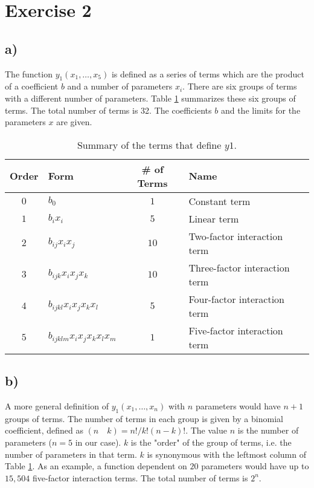 \section*{Exercise 2}

\subsection*{a)}

The function $y_1(x_1, \dots , x_5)$ is defined as a series of terms which are the product of a coefficient $b$ and a number of parameters $x_i$. There are six groups of terms with a different number of parameters. Table \ref{tab:funko_terms} summarizes these six groups of terms. The total number of terms is 32. The coefficients $b$ and the limits for the parameters $x$ are given. \cite{homework-w4}

\begin{table}[h!]
\centering
\begin{tabular}{c|lcl}
	Order & Form & \# of Terms & Name \\
	\hline
	$0$ & $b_0$ & $1$ & Constant term \\
	$1$ & $b_i x_i$ & $5$ & Linear term \\
	$2$ & $b_{ij} x_i x_j$ & $10$ & Two-factor interaction term \\
	$3$ & $b_{ijk} x_i x_j x_k$ & $10$ & Three-factor interaction term \\
	$4$ & $b_{ijkl} x_i x_j x_k x_l$ & $5$ & Four-factor interaction term \\
	$5$ & $b_{ijklm} x_i x_j x_k x_l x_m$ & $1$ & Five-factor interaction term \\
\end{tabular}
\caption{Summary of the terms that define $y1$.}
\label{tab:funko_terms}
\end{table}

\subsection*{b)}

A more general definition of $y_1(x_1, \dots, x_n)$ with $n$ parameters would have $n + 1$ groups of terms. The number of terms in each group is given by a binomial coefficient, defined as $(n \quad k) = n!/k!(n-k)!$. The value $n$ is the number of parameters ($n = 5$ in our case). $k$ is the "order" of the group of terms, i.e. the number of parameters in that term. $k$ is synonymous with the leftmost column of Table \ref{tab:funko_terms}. As an example, a function dependent on $20$ parameters would have up to $15,504$ five-factor interaction terms. The total number of terms is $2^n$.

